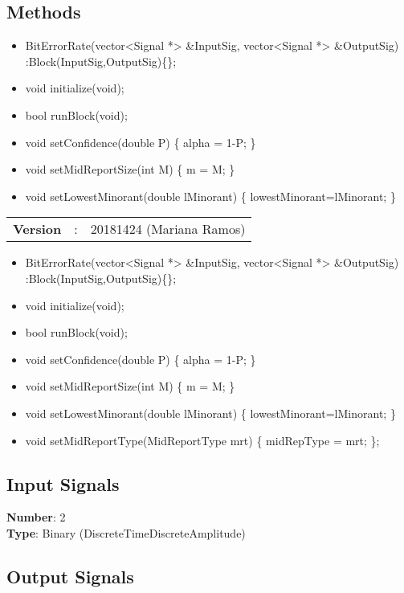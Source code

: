 \begin{refsection}
\subsection*{Methods}

\begin{itemize}
  \item BitErrorRate(vector<Signal *> \&InputSig, vector<Signal *> \&OutputSig) :Block(InputSig,OutputSig)\{\};
  \item void initialize(void);
  \item bool runBlock(void);
  \item void setConfidence(double P) \{ alpha = 1-P; \}
  \item void setMidReportSize(int M) \{ m = M; \}
  \item void setLowestMinorant(double lMinorant) \{ lowestMinorant=lMinorant; \}
\end{itemize}

\begin{tcolorbox}	
\begin{tabular}{p{2.75cm} p{0.2cm} p{10.5cm}} 	
\textbf{Version}       &:& 20181424 (Mariana Ramos)
\end{tabular}
\end{tcolorbox}

\begin{itemize}
  \item BitErrorRate(vector<Signal *> \&InputSig, vector<Signal *> \&OutputSig) :Block(InputSig,OutputSig)\{\};
  \item void initialize(void);
  \item bool runBlock(void);
  \item void setConfidence(double P) \{ alpha = 1-P; \}
  \item void setMidReportSize(int M) \{ m = M; \}
  \item void setLowestMinorant(double lMinorant) \{ lowestMinorant=lMinorant; \}
  \item void setMidReportType(MidReportType mrt) \{ midRepType = mrt; \};
\end{itemize}

\subsection*{Input Signals}

\textbf{Number}: 2\\
\textbf{Type}: Binary (DiscreteTimeDiscreteAmplitude)


\subsection*{Output Signals}


\end{refsection}
